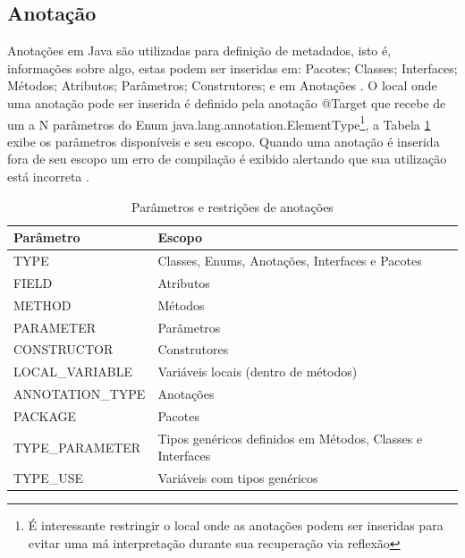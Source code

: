 \subsection{Anotação}

\par Anotações em Java são utilizadas para definição de metadados, isto é, informações sobre algo, estas podem ser inseridas em: Pacotes; Classes; Interfaces; Métodos; Atributos; Parâmetros; Construtores; e em Anotações \cite{jcp2005annotation269}. O local onde uma anotação pode ser inserida é definido pela anotação @Target que recebe de um a N parâmetros do Enum java.lang.annotation.ElementType\footnote{É interessante restringir o local onde as anotações podem ser inseridas para evitar uma má interpretação durante sua recuperação via reflexão}, a Tabela \ref{tab:targets} exibe os parâmetros disponíveis e seu escopo. Quando uma anotação é inserida fora de seu escopo um erro de compilação é exibido alertando que sua utilização está incorreta \cite{joy2000java}.

\begin{table}[H]
    \centering
    \caption{Parâmetros e restrições de anotações}
    \begin{tabular}{|l|l|}
        \hline
        Parâmetro & Escopo \\ \hline
        TYPE & Classes, Enums, Anotações, Interfaces e  Pacotes \\ \hline
        FIELD & Atributos \\ \hline
        METHOD & Métodos \\ \hline
        PARAMETER & Parâmetros \\ \hline
        CONSTRUCTOR & Construtores \\ \hline
        LOCAL\_VARIABLE & Variáveis locais (dentro de métodos) \\ \hline ANNOTATION\_TYPE & Anotações \\ \hline
        PACKAGE & Pacotes \\ \hline
        TYPE\_PARAMETER  & Tipos genéricos definidos em Métodos, Classes e Interfaces \\ \hline
        TYPE\_USE & Variáveis com tipos genéricos \\ \hline
\end{tabular}
    \label{tab:targets}
\end{table}

